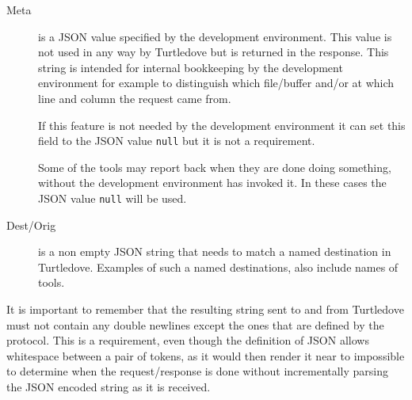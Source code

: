 \begin{description}
\item[Meta] is a JSON value specified by the development environment. This value
  is not used in any way by Turtledove but is returned in the response. This
  string is intended for internal bookkeeping by the development environment for
  example to distinguish which file/buffer and/or at which line and column the
  request came from.

  If this feature is not needed by the development environment it can set this
  field to the JSON value \texttt{null} but it is not a requirement.

  Some of the tools may report back when they are done doing something, without
  the development environment has invoked it. In these cases the JSON value
  \texttt{null} will be used.

\item[Dest/Orig] is a non empty JSON string that needs to match a named destination in
  Turtledove. Examples of such a named destinations, also include names of
  tools.
\end{description}


It is important to remember that the resulting string sent to and from
Turtledove must not contain any double newlines except the ones that are defined by
the protocol. This is a requirement, even though the definition of JSON allows
whitespace between a pair of tokens, as it would then render it near to
impossible to determine when the request/response is done without incrementally
parsing the JSON encoded string as it is received.

